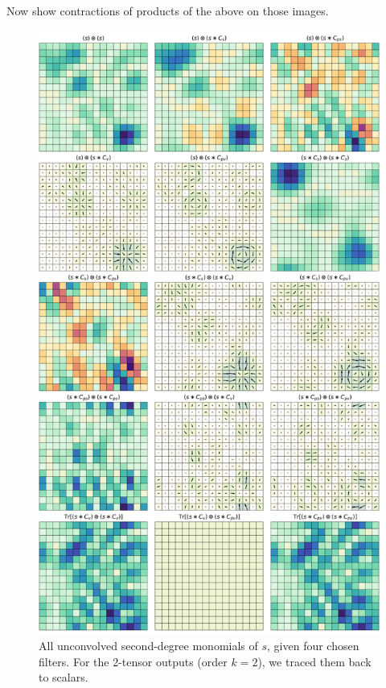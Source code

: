 \documentclass{article}
\theoremstyle{plain}
\begin{document}
Now show contractions of products of the above on those images.

\begin{figure}
  \begin{mdframed}
  \color{captiongray}
  \begin{center}
    \includegraphics[width=\textwidth]{notebooks/monomials_2.png}
  \end{center}
    \caption{All unconvolved second-degree monomials of $s$, given four chosen filters. For the 2-tensor outputs (order $k=2$), we traced them back to scalars.}
  \end{mdframed}
\end{figure}
\end{document}
